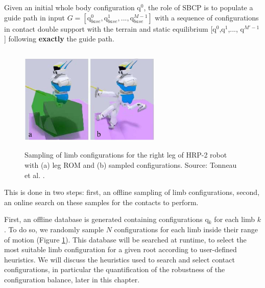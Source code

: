 Given an initial whole body configuration $\mbox{q}^0$, the role of SBCP is to populate a guide path in input $G = [\mbox{q}_{base}^0,\mbox{q}_{base}^1,..., \mbox{q}_{base}^{M-1}]$ with a sequence of configurations in contact double support with the terrain and static equilibrium [$\mbox{q}^0$,$\mbox{q}^1$,..., $\mbox{q}^{M'-1}$] following \textbf{exactly} the guide path. 

\begin{figure}
    \centering
    \includegraphics[width=0.6\textwidth, height=5cm]{Figures/Chapter_CPSB/denoised_config_sampled.jpg}
    \caption{Sampling of limb configurations for the right leg of HRP-2 robot with (a) leg ROM and (b) sampled configurations. Source: Tonneau et al. \cite{AcyclicCP}.}
    \label{fig:cp-sb:samples_rom}
\end{figure}

This is done in two steps: first, an offline sampling of limb configurations, second, an online search on these samples for the contacts to perform.

First, an offline database is generated containing configurations q$_k$ for each limb $k$. %
To do so, we randomly sample $N$ configurations for each limb inside their range of motion (Figure \ref{fig:cp-sb:samples_rom}).
This database will be searched at runtime, to select the most suitable limb configuration for a given root according to user-defined heuristics.
We will discuss the heuristics used to search and select contact configurations, in particular the quantification of the robustness of the configuration balance, later in this chapter. %

